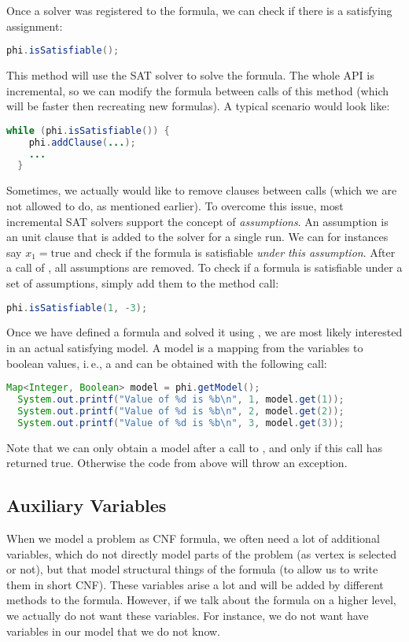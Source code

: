 \documentclass[a4paper, ukenglish, twoside, openright]{jdrasilmanual}
\begin{document}
Once a solver was registered to the formula, we can check if there is
a satisfying assignment:
\begin{lstlisting}[language=Java]
  phi.isSatisfiable();
\end{lstlisting}
This method will use the SAT solver to solve the formula. The whole
API is incremental, so we can modify the formula between calls of
this method (which will be faster then recreating new formulas). A
typical scenario would look like:
\begin{lstlisting}[language=Java]
  while (phi.isSatisfiable()) {
    phi.addClause(...);
    ...
  }
\end{lstlisting}
Sometimes, we actually would like to remove clauses between calls
(which we are not allowed to do, as mentioned earlier). To overcome
this issue, most incremental SAT solvers support the concept of
\emph{assumptions}. An assumption is an unit clause that is added to
the solver for a single run. We can for instances say
$x_1=\mathrm{true}$ and check if the formula is satisfiable
\emph{under this assumption}. After a
call of , all assumptions are removed.
To check if a formula is satisfiable under a set of assumptions,
simply add them to the method call:
\begin{lstlisting}[language=Java]
  phi.isSatisfiable(1, -3);
\end{lstlisting}
Once we have defined a formula and solved it using
, we are most likely interested in an actual
satisfying model. A model is a mapping from the variables to boolean
values, i.\,e., a  and can be obtained
with the following call:
\begin{lstlisting}[language=Java]
  Map<Integer, Boolean> model = phi.getModel();
  System.out.printf("Value of %d is %b\n", 1, model.get(1));
  System.out.printf("Value of %d is %b\n", 2, model.get(2));
  System.out.printf("Value of %d is %b\n", 3, model.get(3));
\end{lstlisting}
Note that we can only obtain a model after a call to
, and only if this call has returned
true. Otherwise the code from above will throw an exception.

\subsection{Auxiliary Variables}
When we model a problem as CNF formula, we often need a lot of
additional variables, which do not directly model parts of the problem
(as vertex is selected or not), but that model structural things of
the formula (to allow us to write them in short CNF). These variables
arise a lot and will be added by different methods to the
formula. However, if we talk about the formula on a higher level, we
actually do not want these variables. For instance, we do not want
have variables in our model that we do not know.
\end{document}
